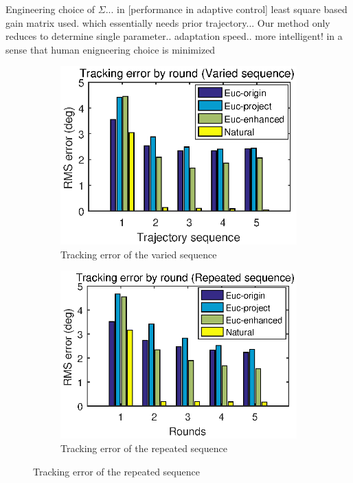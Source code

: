 \documentclass[letterpaper, 10 pt, conference]{ieeeconf}  %
\newtheorem{remark}{Remark}
\begin{document}
Engineering choice of $\Sigma$... in [performance in adaptive control] least square based gain matrix used. which essentially needs prior trajectory... Our method only reduces to determine single parameter.. adaptation speed.. more intelligent! in a sense that human enigneering choice is minimized


\begin{multicols}{1}
\begin{figure}[!htb]
\centering
\begin{subfigure}
\centering
\includegraphics[width=.5\textwidth]{fig/ByRoundVaried.eps}
\caption{Tracking error of the varied sequence}
\label{fig:varied}
\end{subfigure}
\begin{subfigure}
\centering
\includegraphics[width=.5\textwidth]{fig/ByRoundRepeated.eps}
\caption{Tracking error of the repeated sequence}
\label{fig:repeated}
\end{subfigure}
\end{figure}
\end{multicols}
\end{document}
